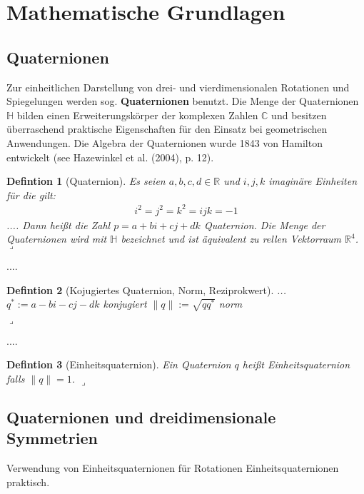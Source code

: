 \newtheorem{defdef}{Defintion}[section]
\newenvironment{definition}[1][]{\begin{defdef}[#1] \normalfont\hspace*{1mm}}{\hfill $\lrcorner$\end{defdef}\vspace{0.2cm}}

\section{Mathematische Grundlagen}
\subsection{Quaternionen}
Zur einheitlichen Darstellung von drei- und vierdimensionalen Rotationen und Spiegelungen werden
sog. \textbf{Quaternionen} benutzt.
Die Menge der Quaternionen $\mathbb{H}$ bilden einen Erweiterungskörper der komplexen Zahlen $\mathbb{C}$ und besitzen überraschend praktische Eigenschaften für den Einsatz bei geometrischen Anwendungen. Die Algebra der Quaternionen wurde 1843 von Hamilton entwickelt (see Hazewinkel et al. (2004), p. 12).

\begin{definition}[Quaternion]
Es seien $a,b,c,d \in \mathbb{R}$ und $i,j,k$ imaginäre Einheiten für die gilt:
\begin{equation*}\begin{split}
i^2 = j^2 = k^2 = ijk = -1
\end{split}\end{equation*}
....
Dann heißt die Zahl $p = a + bi + cj + dk$ Quaternion. Die Menge der Quaternionen wird mit $\mathbb{H}$ bezeichnet
und ist äquivalent zu rellen Vektorraum $\mathbb{R}^4$.
\end{definition}
....
\begin{definition}[Kojugiertes Quaternion, Norm, Reziprokwert]
...
$q^* := a - bi - cj - dk$ konjugiert
$\| q \| := \sqrt{q q^*}$ norm

\end{definition}

....

\begin{definition}[Einheitsquaternion]
Ein Quaternion $q$ heißt Einheitsquaternion falls $\|q\| = 1$.
\end{definition}

\subsection{Quaternionen und dreidimensionale Symmetrien}
Verwendung von Einheitsquaternionen für Rotationen 
Einheitsquaternionen praktisch.

